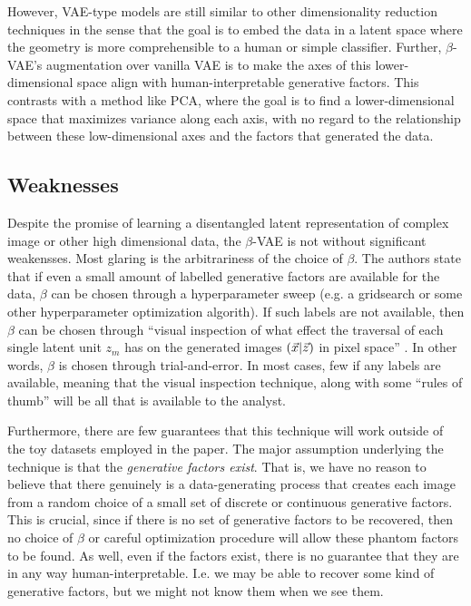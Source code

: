 However, VAE-type models are still similar to other dimensionality reduction techniques in the sense that the goal is to embed the data in a latent space where the geometry is more comprehensible to a human or simple classifier. Further, $\beta$-VAE's augmentation over vanilla VAE is to make the axes of this lower-dimensional space align with human-interpretable generative factors. This contrasts with a method like PCA, where the goal is to find a lower-dimensional space that maximizes variance along each axis, with no regard to the relationship between these low-dimensional axes and the factors that generated the data.

\subsection{Weaknesses}

Despite the promise of learning a disentangled latent representation of complex image or other high dimensional data, the $\beta$-VAE is not without significant weakensses. Most glaring is the arbitrariness of the choice of $\beta$. The authors state that if even a small amount of labelled generative factors are available for the data, $\beta$ can be chosen through a hyperparameter sweep (e.g. a gridsearch or some other hyperparameter optimization algorith). If such labels are not available, then $\beta$ can be chosen through ``visual inspection of what effect the traversal of each single latent unit $z_m$ has on the generated images $(\vec{x}|\vec{z})$ in pixel space'' \cite{higgins2016beta}. In other words, $\beta$ is chosen through trial-and-error. In most cases, few if any labels are available, meaning that the visual inspection technique, along with some ``rules of thumb'' will be all that is available to the analyst.

Furthermore, there are few guarantees that this technique will work outside of the toy datasets employed in the paper. The major assumption underlying the technique is that the {\it generative factors exist}. That is, we have no reason to believe that there genuinely is a data-generating process that creates each image from a random choice of a small set of discrete or continuous generative factors. This is crucial, since if there is no set of generative factors to be recovered, then no choice of $\beta$ or careful optimization procedure will allow these phantom factors to be found. As well, even if the factors exist, there is no guarantee that they are in any way human-interpretable. I.e. we may be able to recover some kind of generative factors, but we might not know them when we see them.